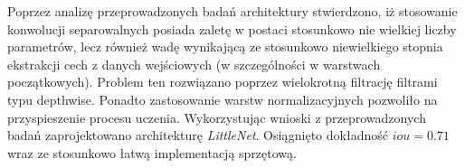 Poprzez analizę przeprowadzonych badań architektury stwierdzono, iż stosowanie konwolucji separowalnych posiada zaletę w postaci stosunkowo nie wielkiej liczby parametrów, lecz również wadę wynikającą ze stosunkowo niewielkiego stopnia ekstrakcji cech z danych wejściowych (w szczególności w warstwach początkowych). 
Problem ten rozwiązano poprzez wielokrotną filtrację filtrami typu depthwise.
Ponadto zastosowanie warstw normalizacyjnych pozwoliło na przyspieszenie procesu uczenia.
Wykorzystując wnioski z przeprowadzonych badań zaprojektowano architekturę \emph{LittleNet}. 
Osiągnięto dokładność $iou = 0.71$ wraz ze stosunkowo łatwą implementacją sprzętową.